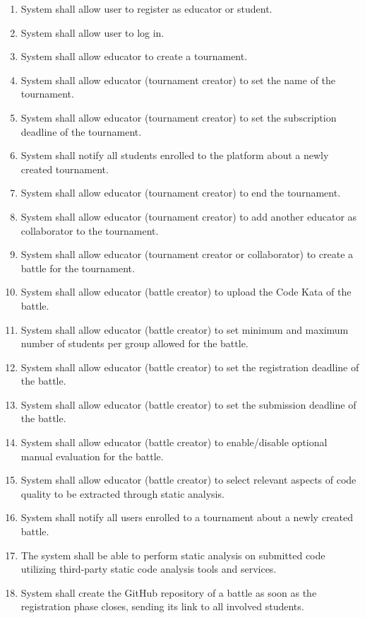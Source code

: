 \begin{enumerate}[label=$\bullet$ \textbf{R\arabic*:}]
    \item System shall allow user to register as educator or student.
    \item System shall allow user to log in.
    \item System shall allow educator to create a tournament.
    \item System shall allow educator (tournament creator) to set the name of the tournament.
    \item System shall allow educator (tournament creator) to set the subscription deadline of the tournament.
    \item System shall notify all students enrolled to the platform about a newly created tournament.
    \item System shall allow educator (tournament creator) to end the tournament.
    \item System shall allow educator (tournament creator) to add another educator as collaborator to the tournament.
    \item System shall allow educator (tournament creator or collaborator) to create a battle for the tournament.
    \item System shall allow educator (battle creator) to upload the Code Kata of the battle.
    \item System shall allow educator (battle creator) to set minimum and maximum number of students per group allowed for the battle.
    \item System shall allow educator (battle creator) to set the registration deadline of the battle.
    \item System shall allow educator (battle creator) to set the submission deadline of the battle.
    \item System shall allow educator (battle creator) to enable/disable optional manual evaluation for the battle.
    \item System shall allow educator (battle creator) to select relevant aspects of code quality to be extracted through static analysis.
    \item System shall notify all users enrolled to a tournament about a newly created battle.
    \item The system shall be able to perform static analysis on submitted code utilizing third-party static code analysis tools and services.
    \item System shall create the GitHub repository of a battle as soon as the registration phase closes, sending its link to all involved students.

\end{enumerate}
